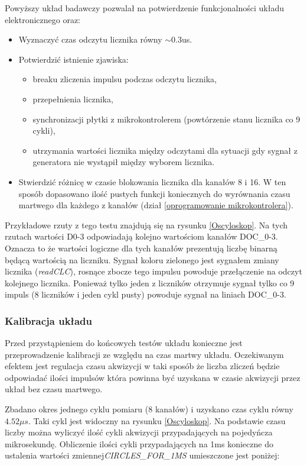Powyższy układ badawczy pozwalał na potwierdzenie funkcjonalności układu elektronicznego oraz:
\begin{itemize}
        \item Wyznaczyć czas odczytu licznika równy $\sim 0.3$us.
        \item Potwierdzić istnienie zjawiska:
        \begin{itemize}
                \item breaku zliczenia impulsu podczas odczytu licznika,
                \item przepełnienia licznika,
                \item synchronizacji płytki z mikrokontrolerem (powtórzenie stanu licznika co 9 cykli), 
                \item utrzymania wartości licznika między odczytami dla sytuacji gdy sygnał z generatora nie wystąpił między wyborem licznika.
        \end{itemize}  
        \item Stwierdzić różnicę w czasie blokowania licznika dla kanałów 8 i 16. W ten sposób dopasowano ilość pustych funkcji koniecznych do wyrównania czasu martwego dla każdego z kanałów (dział \ref{oprogramowanie mikrokontrolera}).
\end{itemize} 

Przykładowe rzuty z tego testu znajdują się na rysunku \ref{Oscyloskop}. Na tych rzutach wartości D0-3 odpowiadają kolejno wartościom kanałów DOC\_0-3. Oznacza to że wartości logiczne dla tych kanałów prezentują liczbę binarną będącą wartością na liczniku. Sygnał koloru zielonego jest sygnałem zmiany licznika (\textit{readCLC}), rosnące zbocze tego impulsu powoduje przełączenie na odczyt kolejnego licznika. Ponieważ tylko jeden z liczników otrzymuje sygnał tylko co 9 impuls (8 liczników i jeden cykl pusty) powoduje sygnał na liniach DOC\_0-3.

\subsubsection{Kalibracja układu}
\label{section kaliblracja}

Przed przystąpieniem do końcowych testów układu konieczne jest przeprowadzenie kalibracji ze względu na czas martwy układu. 
Oczekiwanym efektem jest regulacja czasu akwizycji w taki sposób że liczba zliczeń będzie odpowiadać ilości impulsów która powinna być uzyskana w czasie akwizycji przez układ bez czasu martwego. 

Zbadano okres jednego cyklu pomiaru (8 kanałów) i uzyskano czas cyklu równy $4.52 \mu s$. Taki cykl jest widoczny na rysunku \ref{Oscyloskop}.
Na podstawie czasu liczby można wyliczyć ilość cykli akwizycji przypadających na pojedyńcza mikrosekundę. Obliczenie ilości cykli przypadających na 1ms konieczne do ustalenia wartości zmiennej\textit{CIRCLES\_FOR\_1MS} umieszczone jest poniżej:


